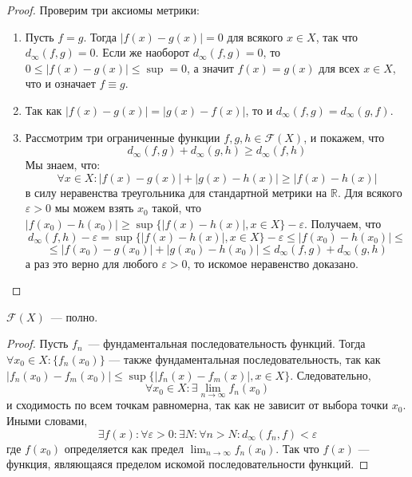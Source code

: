 \documentclass[11pt]{article}
\begin{document}
    \begin{proof}

     Проверим три аксиомы метрики:
    \begin{enumerate}
        \item Пусть $f = g$. Тогда $|f(x) - g(x)| = 0$ для всякого $x \in X$, так что $d_{\infty}(f, g) = 0$. Если же наоборот $d_{\infty}(f, g) = 0$, то $0 \leq |f(x) - g(x)| \leq \sup = 0$, а значит $f(x) = g(x)$ для всех $x \in X$, что и означает $f \equiv g$.
        \item Так как $|f(x) - g(x)| = |g(x) - f(x)|$, то и $d_{\infty}(f, g) = d_{\infty}(g, f)$.
        \item Рассмотрим три ограниченные функции $f, g, h \in \mathcal{F}(X)$, и покажем, что
        \begin{equation*}
            d_{\infty}(f, g) + d_{\infty}(g, h) \geq d_{\infty}(f, h)
        \end{equation*}
        Мы знаем, что:
        \begin{equation*}
            \forall x \in X: |f(x) - g(x)| + |g(x) - h(x)| \geq |f(x) - h(x)|
        \end{equation*}
        в силу неравенства треугольника для стандартной метрики на $\mathbb{R}$. Для всякого $\varepsilon > 0$ мы можем взять $x_0$ такой, что $|f(x_0) - h(x_0)| \geq \sup\{|f(x) - h(x)|, x \in X\} - \varepsilon$. Получаем, что
        \begin{equation*}
            d_{\infty}(f, h) - \varepsilon = \sup\{|f(x) - h(x)|, x \in X\} - \varepsilon \leq |f(x_0) - h(x_0)| \leq
        \end{equation*}
        \begin{equation*}
            \leq |f(x_0) - g(x_0)| + |g(x_0) - h(x_0)| \leq d_{\infty}(f, g) + d_{\infty}(g, h)
        \end{equation*}
        а раз это верно для любого $\varepsilon > 0$, то искомое неравенство доказано.
    \end{enumerate}
    \end{proof}

    \begin{lemma}
    $\mathcal{F}(X)$~--- полно.
    \begin{proof}
    Пусть $f_{n}$~--- фундаментальная последовательность функций. Тогда $\forall x_0 \in X: \{f_{n}(x_0)\}$ --- также фундаментальная последовательность, так как $|f_{n}(x_0) - f_{m}(x_0)| \leq \sup\{|f_{n}(x) - f_{m}(x)|, x \in X\}$. Следовательно,
    \begin{equation*}
        \forall x_0 \in X: \exists \lim_{n \to \infty} f_{n}(x_0)
    \end{equation*}
    и сходимость по всем точкам равномерна, так как не зависит от выбора точки $x_0$. Иными словами,
    \begin{equation*}
        \exists f(x): \forall \varepsilon > 0: \exists N: \forall n > N: d_{\infty}(f_n, f) < \varepsilon
    \end{equation*}
    где $f(x_0)$ определяется как предел $ \lim_{n \to \infty} f_{n}(x_0)$. Так что $f(x)$ --- функция, являющаяся пределом искомой последовательности функций.
    \end{proof}
    \end{lemma}
\end{document}
